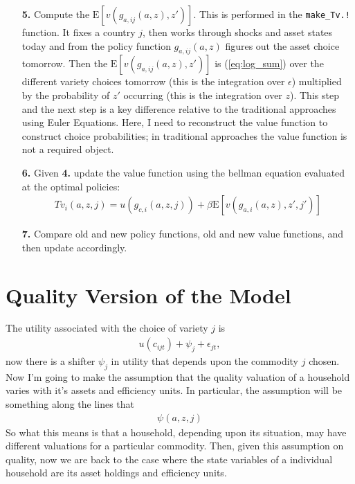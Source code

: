 \documentclass[12pt,pdftex]{article}
\begin{document}
\begin{onehalfspacing}
\begin{itemize}
\item[\textbf{5.}] Compute the $\mathrm{E}\left[ v(g_{a,ij}(a,z), z') \right]$. This is performed in the {\tt{make\_Tv.!}} function. It fixes a country $j$, then works through shocks and asset states today and from the policy function $g_{a,ij}(a,z)$ figures out the asset choice tomorrow. Then the $\mathrm{E}\left[ v(g_{a,ij}(a,z), z') \right]$ is (\ref{eq:log_sum}) over the different variety choices tomorrow (this is the integration over $\epsilon$) multiplied by the probability of $z'$ occurring (this is the integration over $z$). This step and the next step is a key difference relative to the traditional approaches using Euler Equations. Here, I need to reconstruct the value function to construct choice probabilities; in traditional approaches the value function is not a required object. 

\item[\textbf{6.}] Given \textbf{4.} update the value function using the bellman equation evaluated at the optimal policies:
\begin{align}
Tv_{i}(a, z, j) = u(g_{c,i}(a,z,j)) + \beta \mathrm{E}\left[ v(g_{a,i}(a,z), z', j') \right]
\end{align}

\item[\textbf{7.}] Compare old and new policy functions, old and new value functions, and then update accordingly.
\end{itemize}

\newpage

\section{Quality Version of the Model}

The utility associated with the choice of variety $j$ is
\begin{align}
u(c_{ijt}) + \psi_{j} + \epsilon_{jt}, \label{apx-eq:utility-quality}
\end{align}
now there is a shifter $\psi_{j}$ in utility that depends upon the commodity $j$ chosen. Now I'm going to make the assumption that the quality valuation of a household varies with it's assets and efficiency units. In particular, the assumption will be something along the lines that
\begin{align}
\psi(a, z, j)
\end{align}
So what this means is that a household, depending upon its situation, may have different valuations for a particular commodity. Then, given this assumption on quality, now we are back to the case where the state variables of a individual household are its asset holdings and efficiency units.


\end{onehalfspacing}
\end{document}
